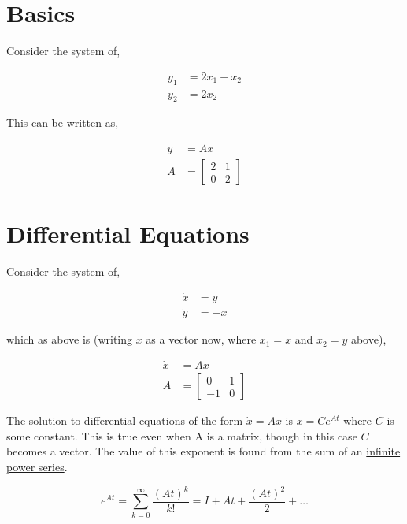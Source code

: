 \documentclass{article}
\begin{document}
\noindent{}

\section{Basics}

Consider the system of,

\begin{align}
    y_1 &= 2x_1 + x_2 \\
    y_2 &= 2x_2
\end{align}

\noindent This can be written as,

\begin{align}
    y &= Ax \\
    A &=
    \begin{bmatrix}
        2 & 1 \\
        0 & 2
    \end{bmatrix}
\end{align}

\section{Differential Equations}

Consider the system of,

\begin{align}
    \dot{x} &= y \\
    \dot{y} &= -x
\end{align}

\noindent which as above is (writing $x$ as a vector now, where $x_1 = x$ and $x_2 = y$ above),

\begin{align}
    \dot{x} &= Ax \\
    A &=
    \begin{bmatrix}
        0 & 1 \\
        -1 & 0
    \end{bmatrix}
\end{align}

\noindent The solution to differential equations of the form $\dot{x} = Ax$ is $x = Ce^{At}$ where $C$ is some constant.
This is true even when A is a matrix, though in this case $C$ becomes a vector.
The value of this exponent is found from the sum of an \href{https://en.wikipedia.org/wiki/Matrix_exponential}{infinite power series}.

\begin{equation}
    e^{At} = \sum_{k=0}^{\infty} \frac{(At)^k}{k!} = I + At + \frac{(At)^2}{2} + \ldots{}
\end{equation}
\end{document}
